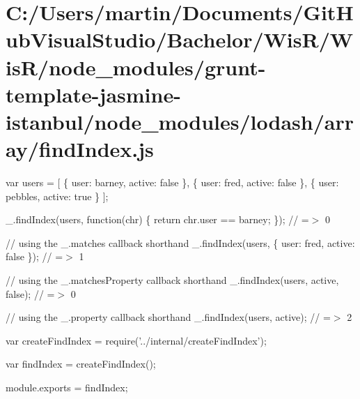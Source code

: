 \hypertarget{_c_1_2_users_2martin_2_documents_2_git_hub_visual_studio_2_bachelor_2_wis_r_2_wis_r_2node_module1833c505e39198ed376b4ed606456b71}{}\section{C\+:/\+Users/martin/\+Documents/\+Git\+Hub\+Visual\+Studio/\+Bachelor/\+Wis\+R/\+Wis\+R/node\+\_\+modules/grunt-\/template-\/jasmine-\/istanbul/node\+\_\+modules/lodash/array/find\+Index.\+js}
var users = \mbox{[} \{ \textquotesingle{}user\textquotesingle{}\+: \textquotesingle{}barney\textquotesingle{}, \textquotesingle{}active\textquotesingle{}\+: false \}, \{ \textquotesingle{}user\textquotesingle{}\+: \textquotesingle{}fred\textquotesingle{}, \textquotesingle{}active\textquotesingle{}\+: false \}, \{ \textquotesingle{}user\textquotesingle{}\+: \textquotesingle{}pebbles\textquotesingle{}, \textquotesingle{}active\textquotesingle{}\+: true \} \mbox{]};

\+\_\+.\+find\+Index(users, function(chr) \{ return chr.\+user == \textquotesingle{}barney\textquotesingle{}; \}); // =$>$ 0

// using the {\ttfamily \+\_\+.\+matches} callback shorthand \+\_\+.\+find\+Index(users, \{ \textquotesingle{}user\textquotesingle{}\+: \textquotesingle{}fred\textquotesingle{}, \textquotesingle{}active\textquotesingle{}\+: false \}); // =$>$ 1

// using the {\ttfamily \+\_\+.\+matches\+Property} callback shorthand \+\_\+.\+find\+Index(users, \textquotesingle{}active\textquotesingle{}, false); // =$>$ 0

// using the {\ttfamily \+\_\+.\+property} callback shorthand \+\_\+.\+find\+Index(users, \textquotesingle{}active\textquotesingle{}); // =$>$ 2


\begin{DoxyCodeInclude}
var createFindIndex = require(\textcolor{stringliteral}{'../internal/createFindIndex'});

var findIndex = createFindIndex();

module.exports = findIndex;
\end{DoxyCodeInclude}
 